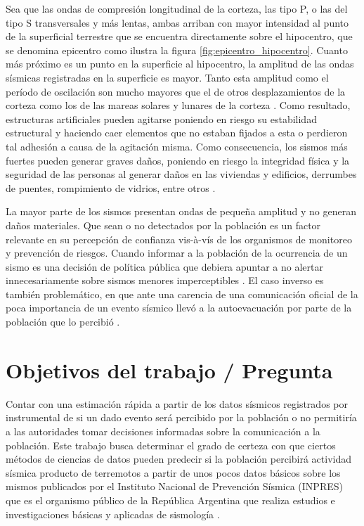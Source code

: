 \documentclass[a4paper]{report}
\begin{document}
Sea que las ondas de compresión longitudinal de la corteza, las tipo P, o las del tipo S transversales y más lentas, ambas arriban con mayor intensidad al punto de la superficial terrestre que se encuentra directamente sobre el hipocentro, que se denomina epicentro \cite[sección 4.1.2]{fowler_solid_1990} como ilustra la figura \ref{fig:epicentro_hipocentro}.
Cuanto más próximo es un punto en la superficie al hipocentro, la amplitud de las ondas sísmicas registradas en la superficie es mayor.
Tanto esta amplitud como el período de oscilación son mucho mayores que el de otros desplazamientos de la corteza como los de las mareas solares y lunares de la corteza \cite[sección 4.1.4]{fowler_solid_1990}.
Como resultado, estructuras artificiales pueden agitarse poniendo en riesgo su estabilidad estructural y haciendo caer elementos que no estaban fijados a esta o perdieron tal adhesión a causa de la agitación misma.
Como consecuencia, los sismos más fuertes pueden generar graves daños, poniendo en riesgo la integridad física y la seguridad de las personas al generar daños en las viviendas y edificios, derrumbes de puentes, rompimiento de vidrios, entre otros \cite{noauthor_que_2018}.

La mayor parte de los sismos presentan ondas de pequeña amplitud y no generan daños materiales.
Que sean o no detectados por la población es un factor relevante en su percepción de confianza vis-à-vís de los organismos de monitoreo y prevención de riesgos.
Cuando informar a la población de la ocurrencia de un sismo es una decisión de política pública que debiera apuntar a no alertar innecesariamente sobre sismos menores imperceptibles \cite{saunders_j_k_twist_nodate}.
El caso inverso es también problemático, en que ante una carencia de una comunicación oficial de la poca importancia de un evento sísmico llevó a la autoevacuación por parte de la población que lo percibió \cite{vaiciulyte_population_2022}. 



\section{Objetivos del trabajo / Pregunta}\label{sec:objetivo}

Contar con una estimación rápida a partir de los datos sísmicos registrados por instrumental de si un dado evento será percibido por la población o no permitiría a las autoridades tomar decisiones informadas sobre la comunicación a la población.
Este trabajo busca determinar el grado de certeza con que ciertos métodos de ciencias de datos pueden predecir si la población percibirá actividad sísmica producto de terremotos a partir de unos pocos datos básicos sobre los mismos publicados por el Instituto Nacional de Prevención Sísmica (INPRES) que es el organismo público de la República Argentina que realiza estudios e investigaciones básicas y aplicadas de sismología \cite{noauthor_instituto_2022}.
\end{document}
